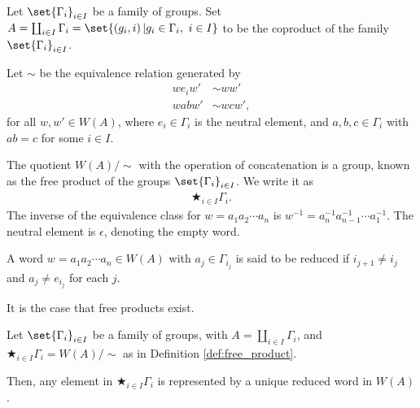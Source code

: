 \begin{definition}\label{def:free_product}
  Let $\set{\Gamma_i}_{i\in I}$ be a family of groups. Set $A = \coprod_{i\in I}\Gamma_i = \set{\left(g_i,i\right) | g_i\in \Gamma_i,~i\in I}$ to be the coproduct of the family $\set{\Gamma_i}_{i\in I}$.\newline

  Let $\sim$ be the equivalence relation generated by
  \begin{align*}
    we_iw' &\sim ww'\\
    wabw' &\sim wcw',
  \end{align*}
  for all $w,w'\in W(A)$, where $e_i\in \Gamma_i$ is the neutral element, and $a,b,c\in \Gamma_i$ with $ab = c$ for some $i\in I$.\newline

  The quotient $W(A) / \sim$ with the operation of concatenation is a group, known as the {free product} of the groups $\set{\Gamma_i}_{i\in I}$. We write it as
  \begin{align*}
    \bigstar_{i\in I}\Gamma_i.
  \end{align*}
  The inverse of the equivalence class for $w = a_1a_2\cdots a_n$ is $w^{-1} = a_{n}^{-1}a_{n-1}^{-1}\cdots a_{1}^{-1}$. The neutral element is $\epsilon$, denoting the empty word.\newline

  A word $w = a_1a_2\cdots a_n\in W(A)$ with $a_j\in \Gamma_{i_j}$ is said to be {reduced} if $i_{j + 1}\neq i_j$ and $a_j \neq e_{i_j}$ for each $j$.
\end{definition}
It is the case that free products exist.
\begin{proposition}\label{prop:reduced_words}
  Let $\set{\Gamma_i}_{i\in I}$ be a family of groups, with $A = \coprod_{i\in I}\Gamma_i$, and $\bigstar_{i\in I}\Gamma_i = W(A) / \sim$ as in Definition \ref{def:free_product}.\newline

  Then, any element in $\bigstar_{i\in I}\Gamma_i$ is represented by a unique reduced word in $W(A)$.
\end{proposition}
